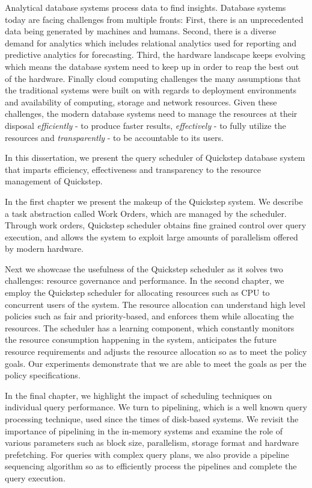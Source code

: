 Analytical database systems process data to find insights. 
Database systems today are facing challenges from multiple fronts: First, there is an unprecedented data being generated by machines and humans.
Second, there is a diverse demand for analytics which includes relational analytics used for reporting and predictive analytics for forecasting.
Third, the hardware landscape keeps evolving which means the database system need to keep up in order to reap the best out of the hardware.
Finally cloud computing challenges the many assumptions that the traditional systems were built on with regards to deployment environments and availability of computing, storage and network resources.
Given these challenges, the modern database systems need to manage the resources at their disposal \textit{efficiently} - to produce faster results, \textit{effectively} - to fully utilize the resources and \textit{transparently} - to be accountable to its users.

In this dissertation, we present the query scheduler of Quickstep database system that imparts efficiency, effectiveness and transparency to the resource management of Quickstep. 

In the first chapter we present the makeup of the Quickstep system. 
We describe a task abstraction called Work Orders, which are managed by the scheduler.
Through work orders, Quickstep scheduler obtains fine grained control over query execution, and allows the system to exploit large amounts of parallelism offered by modern hardware.

Next we showcase the usefulness of the Quickstep scheduler as it solves two challenges: resource governance and performance.
In the second chapter, we employ the Quickstep scheduler for allocating resources such as CPU to concurrent users of the system.
The resource allocation can understand high level policies such as fair and priority-based, and enforces them while allocating the resources.
The scheduler has a learning component, which constantly monitors the resource consumption happening in the system, anticipates the future resource requirements and adjusts the resource allocation so as to meet the policy goals.
Our experiments demonstrate that we are able to meet the goals as per the policy specifications.

In the final chapter, we highlight the impact of scheduling techniques on individual query performance.
We turn to pipelining, which is a well known query processing technique, used since the times of disk-based systems.
We revisit the importance of pipelining in the in-memory systems and examine the role of various parameters such as block size, parallelism, storage format and hardware prefetching.
For queries with complex query plans, we also provide a pipeline sequencing algorithm so as to efficiently process the pipelines and complete the query execution. 